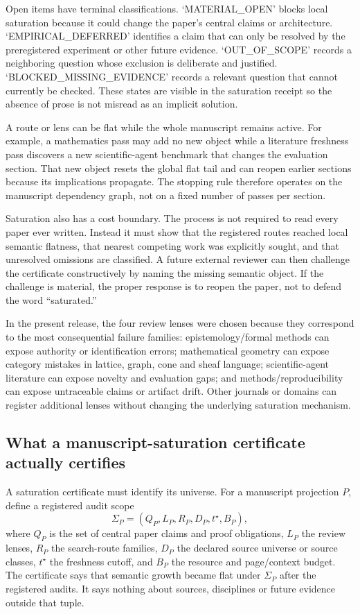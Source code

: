 Open items have terminal classifications. `MATERIAL\_OPEN' blocks local saturation because it could change the paper's central claims or architecture. `EMPIRICAL\_DEFERRED' identifies a claim that can only be resolved by the preregistered experiment or other future evidence. `OUT\_OF\_SCOPE' records a neighboring question whose exclusion is deliberate and justified. `BLOCKED\_MISSING\_EVIDENCE' records a relevant question that cannot currently be checked. These states are visible in the saturation receipt so the absence of prose is not misread as an implicit solution.

A route or lens can be flat while the whole manuscript remains active. For example, a mathematics pass may add no new object while a literature freshness pass discovers a new scientific-agent benchmark that changes the evaluation section. That new object resets the global flat tail and can reopen earlier sections because its implications propagate. The stopping rule therefore operates on the manuscript dependency graph, not on a fixed number of passes per section.

Saturation also has a cost boundary. The process is not required to read every paper ever written. Instead it must show that the registered routes reached local semantic flatness, that nearest competing work was explicitly sought, and that unresolved omissions are classified. A future external reviewer can then challenge the certificate constructively by naming the missing semantic object. If the challenge is material, the proper response is to reopen the paper, not to defend the word ``saturated.''

In the present release, the four review lenses were chosen because they correspond to the most consequential failure families: epistemology/formal methods can expose authority or identification errors; mathematical geometry can expose category mistakes in lattice, graph, cone and sheaf language; scientific-agent literature can expose novelty and evaluation gaps; and methods/reproducibility can expose untraceable claims or artifact drift. Other journals or domains can register additional lenses without changing the underlying saturation mechanism.

\subsection{What a manuscript-saturation certificate actually certifies}

A saturation certificate must identify its universe. For a manuscript projection \(P\), define a registered audit scope
\[
\Sigma_P=(Q_P,L_P,R_P,D_P,t^\star,B_P),
\]
where \(Q_P\) is the set of central paper claims and proof obligations, \(L_P\) the review lenses, \(R_P\) the search-route families, \(D_P\) the declared source universe or source classes, \(t^\star\) the freshness cutoff, and \(B_P\) the resource and page/context budget. The certificate says that semantic growth became flat under \(\Sigma_P\) after the registered audits. It says nothing about sources, disciplines or future evidence outside that tuple.

